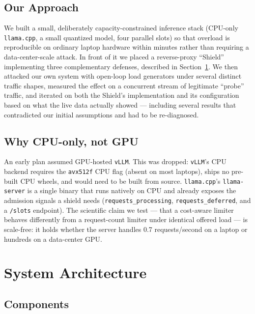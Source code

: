 \documentclass[11pt]{article}
\begin{document}
\subsection{Our Approach}

We built a small, deliberately capacity-constrained inference stack (CPU-only
\texttt{llama.cpp}, a small quantized model, four parallel slots) so that
overload is reproducible on ordinary laptop hardware within minutes rather than
requiring a data-center-scale attack. In front of it we placed a reverse-proxy
``Shield'' implementing three complementary defenses, described in
Section~\ref{sec:architecture}. We then attacked our own system with
open-loop load generators under several distinct traffic shapes, measured the
effect on a concurrent stream of legitimate ``probe'' traffic, and iterated on
both the Shield's implementation and its configuration based on what the live
data actually showed --- including several results that contradicted our
initial assumptions and had to be re-diagnosed.

\subsection{Why CPU-only, not GPU}

An early plan assumed GPU-hosted \texttt{vLLM}. This was dropped:
\texttt{vLLM}'s CPU backend requires the \texttt{avx512f} CPU flag (absent on
most laptops), ships no pre-built CPU wheels, and would need to be built from
source. \texttt{llama.cpp}'s \texttt{llama-server} is a single binary that
runs natively on CPU and already exposes the admission signals a shield needs
(\texttt{requests\_processing}, \texttt{requests\_deferred}, and a
\texttt{/slots} endpoint). The scientific claim we test --- that a cost-aware
limiter behaves differently from a request-count limiter under identical
offered load --- is scale-free: it holds whether the server handles 0.7
requests/second on a laptop or hundreds on a data-center GPU.

\section{System Architecture}
\label{sec:architecture}

\subsection{Components}
\end{document}
